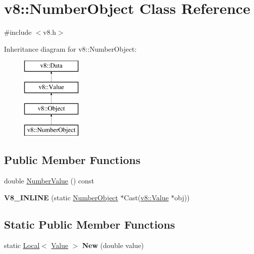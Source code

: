 \hypertarget{classv8_1_1_number_object}{}\section{v8\+:\+:Number\+Object Class Reference}
\label{classv8_1_1_number_object}


{\ttfamily \#include $<$v8.\+h$>$}

Inheritance diagram for v8\+:\+:Number\+Object\+:\begin{figure}[H]
\begin{center}
\leavevmode
\includegraphics[height=4.000000cm]{classv8_1_1_number_object}
\end{center}
\end{figure}
\subsection*{Public Member Functions}
\begin{DoxyCompactItemize}
\item 
double \hyperlink{classv8_1_1_number_object_ac8a39b55bb42047ace434bf7913f142a}{Number\+Value} () const 
\item 
\hypertarget{classv8_1_1_number_object_af8627ae8a973abb925b563309dfd74f8}{}{\bfseries V8\+\_\+\+I\+N\+L\+I\+N\+E} (static \hyperlink{classv8_1_1_number_object}{Number\+Object} $\ast$Cast(\hyperlink{classv8_1_1_value}{v8\+::\+Value} $\ast$obj))\label{classv8_1_1_number_object_af8627ae8a973abb925b563309dfd74f8}

\end{DoxyCompactItemize}
\subsection*{Static Public Member Functions}
\begin{DoxyCompactItemize}
\item 
\hypertarget{classv8_1_1_number_object_a751b0759d8e5758fdf568975b865587c}{}static \hyperlink{classv8_1_1_local}{Local}$<$ \hyperlink{classv8_1_1_value}{Value} $>$ {\bfseries New} (double value)\label{classv8_1_1_number_object_a751b0759d8e5758fdf568975b865587c}

\end{DoxyCompactItemize}


